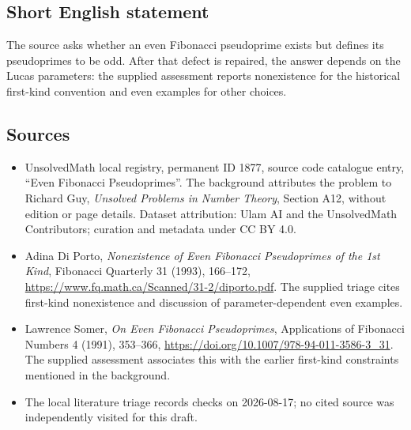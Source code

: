 \documentclass[11pt]{article}
\begin{document}
\subsection{Short English statement}
The source asks whether an even Fibonacci pseudoprime exists but defines its pseudoprimes to be odd. After that defect is repaired, the answer depends on the Lucas parameters: the supplied assessment reports nonexistence for the historical first-kind convention and even examples for other choices.
\subsection{Sources}
\begin{itemize}
\item UnsolvedMath local registry, permanent ID 1877, source code catalogue entry, ``Even Fibonacci Pseudoprimes''. The background attributes the problem to Richard Guy, \emph{Unsolved Problems in Number Theory}, Section A12, without edition or page details. Dataset attribution: Ulam AI and the UnsolvedMath Contributors; curation and metadata under CC BY 4.0.
\item Adina Di Porto, \emph{Nonexistence of Even Fibonacci Pseudoprimes of the 1st Kind}, Fibonacci Quarterly 31 (1993), 166--172, \url{https://www.fq.math.ca/Scanned/31-2/diporto.pdf}. The supplied triage cites first-kind nonexistence and discussion of parameter-dependent even examples.
\item Lawrence Somer, \emph{On Even Fibonacci Pseudoprimes}, Applications of Fibonacci Numbers 4 (1991), 353--366, \url{https://doi.org/10.1007/978-94-011-3586-3_31}. The supplied assessment associates this with the earlier first-kind constraints mentioned in the background.
\item The local literature triage records checks on 2026-08-17; no cited source was independently visited for this draft.
\end{itemize}
\end{document}
